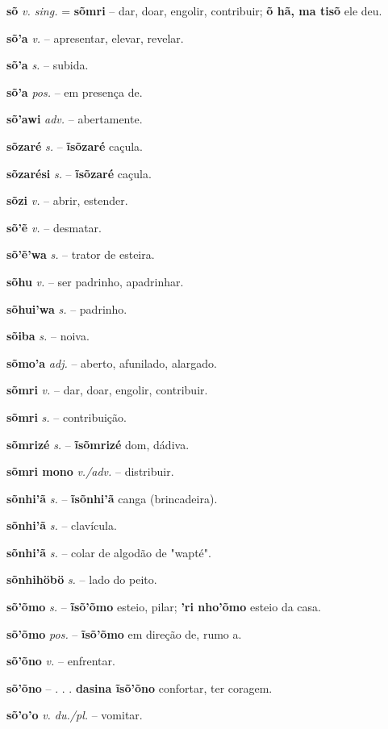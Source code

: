 \textbf{sõ} \textit{v. sing.} = \textbf{sõmri} -- dar, doar, engolir, contribuir; \textbf{õ hã, ma tisõ} ele deu.

\textbf{sõ'a} \textit{v.} -- apresentar, elevar, revelar.

\textbf{sõ'a} \textit{s.} -- subida.

\textbf{sõ'a} \textit{pos.} -- em presença de.

\textbf{sõ'awi} \textit{adv.} -- abertamente.

\textbf{sõzaré} \textit{s.} -- \textbf{ĩsõzaré} caçula.

\textbf{sõzarési} \textit{s.} -- \textbf{ĩsõzaré} caçula.

\textbf{sõzi} \textit{v.} -- abrir, estender.

\textbf{sõ'ẽ} \textit{v.} -- desmatar.

\textbf{sõ'ẽ'wa} \textit{s.} -- trator de esteira.

\textbf{sõhu} \textit{v.} -- ser padrinho, apadrinhar.

\textbf{sõhui'wa} \textit{s.} -- padrinho.

\textbf{sõiba} \textit{s.} -- noiva.

\textbf{sõmo'a} \textit{adj.} -- aberto, afunilado, alargado.

\textbf{sõmri} \textit{v.} -- dar, doar, engolir, contribuir.

\textbf{sõmri} \textit{s.} -- contribuição.

\textbf{sõmrizé} \textit{s.} -- \textbf{ĩsõmrizé} dom, dádiva.

\textbf{sõmri mono} \textit{v./adv.} -- distribuir.

\textbf{sõnhi'ã} \textit{s.} -- \textbf{ĩsõnhi'ã} canga (brincadeira).

\textbf{sõnhi'ã} \textit{s.} -- clavícula.

\textbf{sõnhi'ã} \textit{s.} -- colar de algodão de "wapté".

\textbf{sõnhihöbö} \textit{s.} -- lado do peito.

\textbf{sõ'õmo} \textit{s.} -- \textbf{ĩsõ'õmo} esteio, pilar; \textbf{'ri nho'õmo} esteio da casa.

\textbf{sõ'õmo} \textit{pos.} -- \textbf{ĩsõ'õmo} em direção de, rumo a.

\textbf{sõ'õno} \textit{v.} -- enfrentar.

\textbf{sõ'õno} \textit{} -- . . . \textbf{dasina ĩsõ'õno} confortar, ter coragem.

\textbf{sõ'o'o} \textit{v. du./pl.} -- vomitar.

